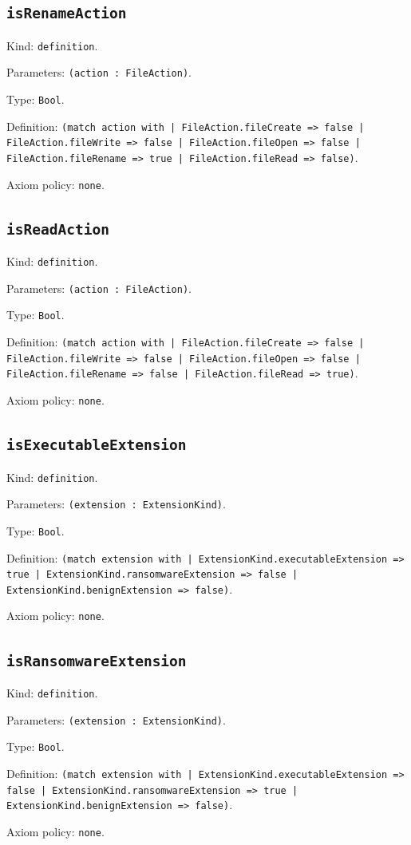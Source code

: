 \documentclass[11pt]{article}
\begin{document}
\subsection*{\texttt{isRenameAction}}
\noindent Kind: \texttt{definition}.\par
\noindent Parameters: \texttt{(action : FileAction)}.\par
\noindent Type: \texttt{Bool}.\par
\noindent Definition: \texttt{(match action with | FileAction.fileCreate => false | FileAction.fileWrite => false | FileAction.fileOpen => false | FileAction.fileRename => true | FileAction.fileRead => false)}.\par
\noindent Axiom policy: \texttt{none}.\par
\subsection*{\texttt{isReadAction}}
\noindent Kind: \texttt{definition}.\par
\noindent Parameters: \texttt{(action : FileAction)}.\par
\noindent Type: \texttt{Bool}.\par
\noindent Definition: \texttt{(match action with | FileAction.fileCreate => false | FileAction.fileWrite => false | FileAction.fileOpen => false | FileAction.fileRename => false | FileAction.fileRead => true)}.\par
\noindent Axiom policy: \texttt{none}.\par
\subsection*{\texttt{isExecutableExtension}}
\noindent Kind: \texttt{definition}.\par
\noindent Parameters: \texttt{(extension : ExtensionKind)}.\par
\noindent Type: \texttt{Bool}.\par
\noindent Definition: \texttt{(match extension with | ExtensionKind.executableExtension => true | ExtensionKind.ransomwareExtension => false | ExtensionKind.benignExtension => false)}.\par
\noindent Axiom policy: \texttt{none}.\par
\subsection*{\texttt{isRansomwareExtension}}
\noindent Kind: \texttt{definition}.\par
\noindent Parameters: \texttt{(extension : ExtensionKind)}.\par
\noindent Type: \texttt{Bool}.\par
\noindent Definition: \texttt{(match extension with | ExtensionKind.executableExtension => false | ExtensionKind.ransomwareExtension => true | ExtensionKind.benignExtension => false)}.\par
\noindent Axiom policy: \texttt{none}.\par
\end{document}

